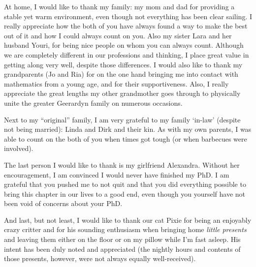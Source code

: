{%
At home, I would like to thank my family: my mom and dad for providing a stable yet warm environment, even though not everything has been clear sailing.
I really appreciate how the both of you have always found a way to make the best out of it and how I could always count on you.
Also my sister Lara and her husband Youri, for being nice people on whom you can always count.
Although we are completely different in our professions and thinking, I place great value in getting along very well, despite those differences.
I would also like to thank my grandparents (Jo and Ria) for on the one hand bringing me into contact with mathematics from a young age, and for their supportiveness.
Also, I really appreciate the great lengths my other grandmother goes through to physically unite the greater Geerardyn family on numerous occasions.

Next to my ``original'' family, I am very grateful to my family `in-law' (despite not being married): Linda and Dirk and their kin.
As with my own parents, I was able to count on the both of you when times got tough (or when barbecues were involved).

The last person I would like to thank is my girlfriend Alexandra.
Without her encouragement, I am convinced I would never have finished my PhD.
I am grateful that you pushed me to not quit and that you did everything possible to bring this chapter in our lives to a good end, even though you yourself have not been void of concerns about your PhD.

And last, but not least, I would like to thank our cat Pixie for being an enjoyably crazy critter and for his sounding enthusiasm when bringing home \emph{little presents} and leaving them either on the floor or on my pillow while I'm fast asleep.
His intent has been duly noted and appreciated (the nightly hours and contents of those presents, however, were not always equally well-received).
}
